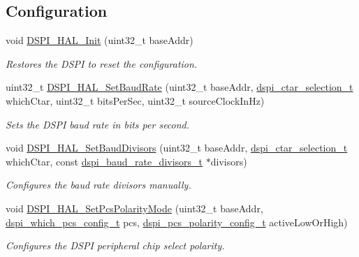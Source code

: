 \subsection*{Configuration}
\begin{DoxyCompactItemize}
\item 
void \hyperlink{group__dspi__hal_gacd6eeaedf410e9e1f41b5b33649e2f53}{D\+S\+P\+I\+\_\+\+H\+A\+L\+\_\+\+Init} (uint32\+\_\+t base\+Addr)
\begin{DoxyCompactList}\small\item\em Restores the D\+S\+PI to reset the configuration. \end{DoxyCompactList}\item 
uint32\+\_\+t \hyperlink{group__dspi__hal_ga3884240ccf644a9e72baa9bddaf879a9}{D\+S\+P\+I\+\_\+\+H\+A\+L\+\_\+\+Set\+Baud\+Rate} (uint32\+\_\+t base\+Addr, \hyperlink{group__dspi__hal_ga8d2c04fe9fd119bdcc613f4c35095721}{dspi\+\_\+ctar\+\_\+selection\+\_\+t} which\+Ctar, uint32\+\_\+t bits\+Per\+Sec, uint32\+\_\+t source\+Clock\+In\+Hz)
\begin{DoxyCompactList}\small\item\em Sets the D\+S\+PI baud rate in bits per second. \end{DoxyCompactList}\item 
void \hyperlink{group__dspi__hal_ga50dd7a2c010f8075d8781a5f11840687}{D\+S\+P\+I\+\_\+\+H\+A\+L\+\_\+\+Set\+Baud\+Divisors} (uint32\+\_\+t base\+Addr, \hyperlink{group__dspi__hal_ga8d2c04fe9fd119bdcc613f4c35095721}{dspi\+\_\+ctar\+\_\+selection\+\_\+t} which\+Ctar, const \hyperlink{group__dspi__hal_ga6426ca15a4ec2fd17077db5a401737e5}{dspi\+\_\+baud\+\_\+rate\+\_\+divisors\+\_\+t} $\ast$divisors)
\begin{DoxyCompactList}\small\item\em Configures the baud rate divisors manually. \end{DoxyCompactList}\item 
void \hyperlink{group__dspi__hal_ga6204761965cfc6d7ad5fe88ff4529162}{D\+S\+P\+I\+\_\+\+H\+A\+L\+\_\+\+Set\+Pcs\+Polarity\+Mode} (uint32\+\_\+t base\+Addr, \hyperlink{group__dspi__hal_ga5377cd155b68bf00351fff6e58230062}{dspi\+\_\+which\+\_\+pcs\+\_\+config\+\_\+t} pcs, \hyperlink{group__dspi__hal_ga8e5abd30c155a0fa6cc651a6535e8aee}{dspi\+\_\+pcs\+\_\+polarity\+\_\+config\+\_\+t} active\+Low\+Or\+High)
\begin{DoxyCompactList}\small\item\em Configures the D\+S\+PI peripheral chip select polarity. \end{DoxyCompactList}\item 

\end{DoxyCompactItemize}

